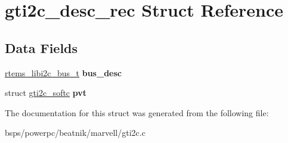 \hypertarget{structgti2c__desc__rec}{}\section{gti2c\+\_\+desc\+\_\+rec Struct Reference}
\label{structgti2c__desc__rec}
\subsection*{Data Fields}
\begin{DoxyCompactItemize}
\item 
\mbox{\label{structgti2c__desc__rec_abfd51e4934cb27c841556b4fda9ba1d1}} 
\mbox{\hyperlink{structrtems__libi2c__bus__t__}{rtems\+\_\+libi2c\+\_\+bus\+\_\+t}} {\bfseries bus\+\_\+desc}
\item 
\mbox{\label{structgti2c__desc__rec_a6547a84f72f4c015c7ba651c61cb86d3}} 
struct \mbox{\hyperlink{structgti2c__softc}{gti2c\+\_\+softc}} {\bfseries pvt}
\end{DoxyCompactItemize}


The documentation for this struct was generated from the following file\+:\begin{DoxyCompactItemize}
\item 
bsps/powerpc/beatnik/marvell/gti2c.\+c\end{DoxyCompactItemize}
